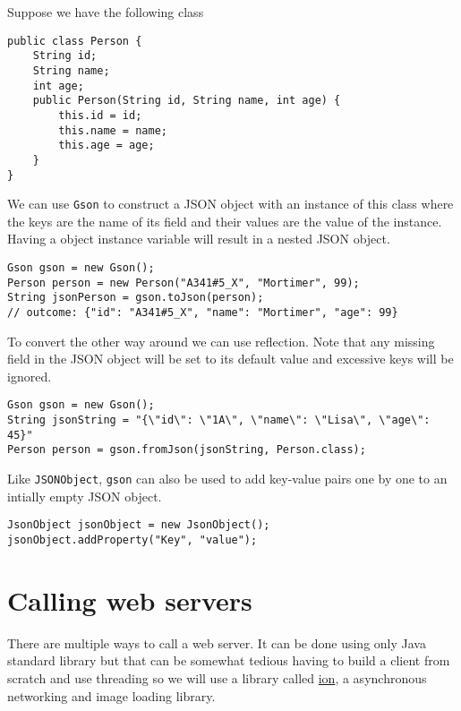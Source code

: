 Suppose we have the following class
\begin{lstlisting}[style=A_Java]
public class Person {
	String id;
	String name;
	int age;
	public Person(String id, String name, int age) {
		this.id = id;
		this.name = name;
		this.age = age;
	}
}
\end{lstlisting}
We can use \texttt{Gson} to construct a JSON object with an instance of this class where the keys are the name of its field and their values are the value of the instance. Having a object instance variable will result in a nested JSON object.
\begin{lstlisting}[style=A_Java]
Gson gson = new Gson();
Person person = new Person("A341#5_X", "Mortimer", 99);
String jsonPerson = gson.toJson(person);
// outcome: {"id": "A341#5_X", "name": "Mortimer", "age": 99}
\end{lstlisting}
To convert the other way around we can use reflection. Note that any missing field in the JSON object will be set to its default value and excessive keys will be ignored.
\begin{lstlisting}[style=A_Java]
Gson gson = new Gson();
String jsonString = "{\"id\": \"1A\", \"name\": \"Lisa\", \"age\": 45}"
Person person = gson.fromJson(jsonString, Person.class);
\end{lstlisting}
Like \texttt{JSONObject}, \texttt{gson} can also be used to add key-value pairs one by one to an intially empty JSON object.
\begin{lstlisting}[style=A_Java]
JsonObject jsonObject = new JsonObject();
jsonObject.addProperty("Key", "value");
\end{lstlisting}

\section{Calling web servers}
There are multiple ways to call a web server. It can be done using only Java standard library but that can be somewhat tedious having to build a client from scratch and use threading so we will use a library called \href{https://github.com/koush/ion}{ion}, a asynchronous networking and image loading library.\\

